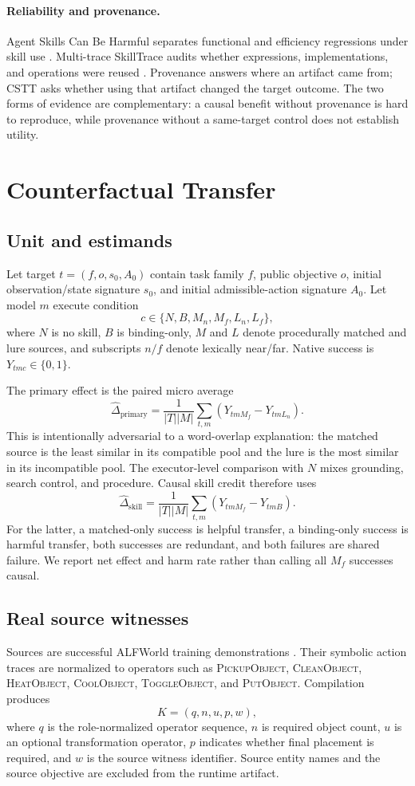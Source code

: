 \documentclass[10pt]{article}
\begin{document}
\paragraph{Reliability and provenance.}
Agent Skills Can Be Harmful separates functional and efficiency regressions
under skill use \citep{dong2026harmful}. Multi-trace SkillTrace audits whether
expressions, implementations, and operations were reused
\citep{chen2026multitrace}. Provenance answers where an artifact came from;
CSTT asks whether using that artifact changed the target outcome. The two forms
of evidence are complementary: a causal benefit without provenance is hard to
reproduce, while provenance without a same-target control does not establish
utility.

\section{Counterfactual Transfer}
\subsection{Unit and estimands}
Let target $t=(f,o,s_0,A_0)$ contain task family $f$, public objective $o$,
initial observation/state signature $s_0$, and initial admissible-action
signature $A_0$. Let model $m$ execute condition
\[
c\in\{N,B,M_n,M_f,L_n,L_f\},
\]
where $N$ is no skill, $B$ is binding-only, $M$ and $L$ denote procedurally
matched and lure sources, and subscripts $n/f$ denote lexically near/far.
Native success is $Y_{tmc}\in\{0,1\}$.

The primary effect is the paired micro average
\[
\widehat\Delta_{\mathrm{primary}}=
\frac{1}{|T||M|}\sum_{t,m}(Y_{tmM_f}-Y_{tmL_n}).
\]
This is intentionally adversarial to a word-overlap explanation: the matched
source is the least similar in its compatible pool and the lure is the most
similar in its incompatible pool. The executor-level comparison with $N$ mixes
grounding, search control, and procedure. Causal skill credit therefore uses
\[
\widehat\Delta_{\mathrm{skill}}=
\frac{1}{|T||M|}\sum_{t,m}(Y_{tmM_f}-Y_{tmB}).
\]
For the latter, a matched-only success is helpful transfer, a binding-only
success is harmful transfer, both successes are redundant, and both failures
are shared failure. We report net effect and harm rate rather than calling all
$M_f$ successes causal.

\subsection{Real source witnesses}
Sources are successful ALFWorld training demonstrations
\citep{shridhar2021alfworld}. Their symbolic action traces are normalized to
operators such as \textsc{PickupObject}, \textsc{CleanObject},
\textsc{HeatObject}, \textsc{CoolObject}, \textsc{ToggleObject}, and
\textsc{PutObject}. Compilation produces
\[
K=(q,n,u,p,w),
\]
where $q$ is the role-normalized operator sequence, $n$ is required object
count, $u$ is an optional transformation operator, $p$ indicates whether final
placement is required, and $w$ is the source witness identifier. Source entity
names and the source objective are excluded from the runtime artifact.
\end{document}
